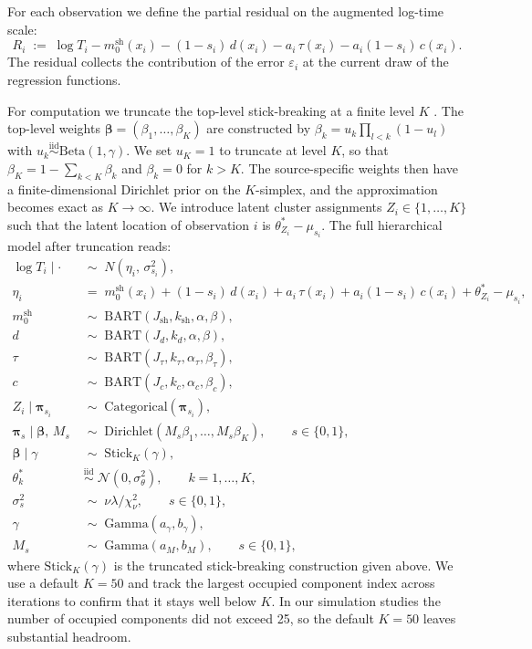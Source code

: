 For each observation we define the partial residual on the augmented log-time scale:
\begin{equation}
R_i \;:=\; \log T_i - m_0^{\mathrm{sh}}(x_i) - (1 - s_i)\, d(x_i) - a_i\, \tau(x_i) - a_i(1 - s_i)\, c(x_i).
\label{eq:sm-Ri}
\end{equation}
The residual collects the contribution of the error $\varepsilon_i$ at the current draw of the regression functions.

For computation we truncate the top-level stick-breaking at a finite level $K$ \citep{sethuraman1994constructive, ishwaran2001gibbs}.
The top-level weights $\bm{\beta} = (\beta_1, \ldots, \beta_K)$ are constructed by $\beta_k = u_k \prod_{l < k}(1 - u_l)$ with $u_k \stackrel{\mathrm{iid}}{\sim} \mathrm{Beta}(1, \gamma)$.
We set $u_K = 1$ to truncate at level $K$, so that $\beta_K = 1 - \sum_{k < K} \beta_k$ and $\beta_k = 0$ for $k > K$.
The source-specific weights then have a finite-dimensional Dirichlet prior on the $K$-simplex, and the approximation becomes exact as $K \to \infty$.
We introduce latent cluster assignments $Z_i \in \{1, \ldots, K\}$ such that the latent location of observation $i$ is $\theta_{Z_i}^* - \mu_{s_i}$.
The full hierarchical model after truncation reads:
\begin{align}
\log T_i \mid \cdot &\;\sim\; N\!\left(\eta_i,\, \sigma_{s_i}^2\right),\\
\eta_i &\;=\; m_0^{\mathrm{sh}}(x_i) + (1 - s_i)\, d(x_i) + a_i\, \tau(x_i) + a_i(1 - s_i)\, c(x_i) + \theta_{Z_i}^* - \mu_{s_i},
  \label{eq:sm-eta}\\
m_0^{\mathrm{sh}} &\;\sim\; \mathrm{BART}(J_{\mathrm{sh}}, k_{\mathrm{sh}}, \alpha, \beta),\\
d &\;\sim\; \mathrm{BART}(J_d, k_d, \alpha, \beta),\\
\tau &\;\sim\; \mathrm{BART}(J_\tau, k_\tau, \alpha_\tau, \beta_\tau),\\
c &\;\sim\; \mathrm{BART}(J_c, k_c, \alpha_c, \beta_c),\\
Z_i \mid \bm{\pi}_{s_i} &\;\sim\; \mathrm{Categorical}(\bm{\pi}_{s_i}),\\
\bm{\pi}_s \mid \bm{\beta},\, M_s &\;\sim\; \mathrm{Dirichlet}(M_s \beta_1, \ldots, M_s \beta_K), \qquad s \in \{0, 1\},\\
\bm{\beta} \mid \gamma &\;\sim\; \mathrm{Stick}_K(\gamma),\\
\theta_k^* &\;\stackrel{\mathrm{iid}}{\sim}\; \mathcal{N}(0, \sigma_\theta^2), \qquad k = 1, \ldots, K,\\
\sigma_s^2 &\;\sim\; \nu \lambda / \chi^2_\nu, \qquad s \in \{0, 1\},\\
\gamma &\;\sim\; \mathrm{Gamma}(a_\gamma, b_\gamma),\\
M_s &\;\sim\; \mathrm{Gamma}(a_M, b_M), \qquad s \in \{0, 1\},
\end{align}
where $\mathrm{Stick}_K(\gamma)$ is the truncated stick-breaking construction given above.
We use a default $K = 50$ and track the largest occupied component index across iterations to confirm that it stays well below $K$.
In our simulation studies the number of occupied components did not exceed 25, so the default $K = 50$ leaves substantial headroom.


